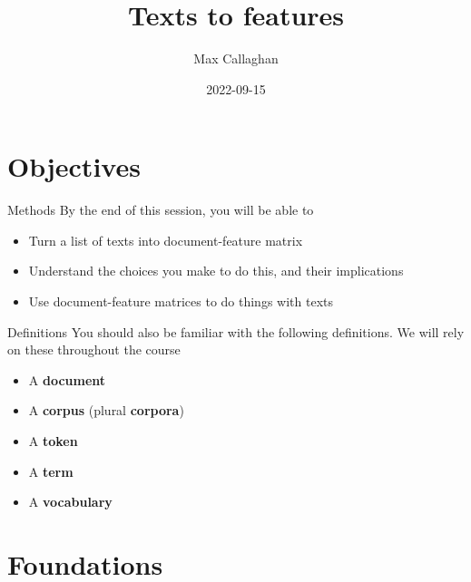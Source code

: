 \documentclass[
  10pt,
  ignorenonframetext,
  aspectratio=169]{beamer}
\title{Texts to features}
\author{Max Callaghan}
\date{2022-09-15}
\begin{document}
\frame{\titlepage}

\hypertarget{objectives}{%
\section{Objectives}\label{objectives}}

\begin{frame}{Methods}
\protect\hypertarget{methods}{}
By the end of this session, you will be able to

\begin{itemize}
  \item<1-> Turn a list of texts into document-feature matrix
  \item<2-> Understand the choices you make to do this, and their implications
  \item<3-> Use document-feature matrices to do things with texts
\end{itemize}
\end{frame}

\begin{frame}{Definitions}
\protect\hypertarget{definitions}{}
You should also be familiar with the following definitions. We will rely
on these throughout the course

\begin{itemize}
  \item<1-> A \textbf{document} 
  \item<2-> A \textbf{corpus} (plural \textbf{corpora}) 
  \item<3-> A \textbf{token}
  \item<4-> A \textbf{term} 
  \item<5-> A \textbf{vocabulary}
\end{itemize}
\end{frame}

\hypertarget{foundations}{%
\section{Foundations}\label{foundations}}
\end{document}
